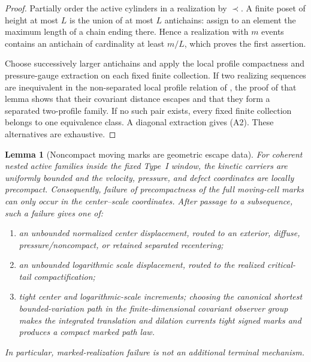 \documentclass[11pt]{amsart}
\numberwithin{equation}{section}
\theoremstyle{plain}
\newtheorem{lemma}[lemma]{Lemma}
\theoremstyle{definition}
\theoremstyle{remark}
\begin{document}
\begin{proof}
Partially order the active cylinders in a realization by \(\prec\).  A finite
poset of height at most \(L\) is the union of at most \(L\) antichains: assign
to an element the maximum length of a chain ending there.  Hence a realization
with \(m\) events contains an antichain of cardinality at least \(m/L\), which
proves the first assertion.

Choose successively larger antichains and apply the local profile compactness
and pressure-gauge extraction on each fixed finite collection.  If two
realizing sequences are inequivalent in the non-separated local profile
relation of
, the proof of that lemma
shows that their covariant distance escapes and that they form a separated
two-profile family.  If no such pair exists, every fixed finite collection
belongs to one equivalence class.  A diagonal extraction gives
\textup{(A2)}.  These alternatives are exhaustive.
\end{proof}

\begin{lemma}[Noncompact moving marks are geometric escape data]
\label{lem:moving-mark-defect-routing}
For coherent nested active families inside the fixed Type~I window, the
kinetic carriers are uniformly bounded and the velocity, pressure, and defect
coordinates are locally precompact.  Consequently, failure of precompactness
of the full moving-cell marks can only occur in the center--scale coordinates.
After passage to a subsequence, such a failure gives one of:
\begin{enumerate}[label=\textup{(G\arabic*)}]
 \item an unbounded normalized center displacement, routed to an exterior,
 diffuse, pressure/noncompact, or retained separated recentering;
 \item an unbounded logarithmic scale displacement, routed to the realized
 critical-tail compactification;
 \item tight center and logarithmic-scale increments; choosing the canonical
 shortest bounded-variation path in the finite-dimensional covariant observer
 group makes the integrated translation and dilation currents tight signed
 marks and produces a compact marked path law.
\end{enumerate}
In particular, marked-realization failure is not an additional terminal
mechanism.
\end{lemma}
\end{document}
